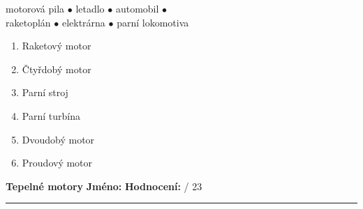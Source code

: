 \documentclass[../main.tex]{subfiles}
\begin{document}
\begin{enumerate}[label={\textbf{\arabic*.}}]
\begin{minipage}{0.45\textwidth}
        \begin{tcolorbox}[colframe=black, colback=white, boxrule=0.6pt]
            {motorová pila \(\bullet\) letadlo \(\bullet\) automobil \(\bullet\) \\ raketoplán \(\bullet\) elektrárna \(\bullet\) parní lokomotiva}
        \end{tcolorbox}
        \begin{enumerate}[label={\arabic*.}]
            \item {Raketový motor}\hfill\tecky{4cm}
            \item {Čtyřdobý motor}\hfill\tecky{4cm}
            \item {Parní stroj}\hfill\tecky{4cm}
            \item {Parní turbína}\hfill\tecky{4cm}
            \item {Dvoudobý motor}\hfill\tecky{4cm}
            \item {Proudový motor}\hfill\tecky{4cm}
        \end{enumerate}
    \end{minipage}
    \hfill
    
    \newpage\pagestyle{empty}
\end{enumerate}
    {\Large\textbf{Tepelné motory}}
    \hfill
    \textbf{Jméno:}
    \tecky{3cm}
    \hspace{0.25cm}
    \textbf{Hodnocení:}
    \tecky{0.5cm}
    {/}
    {23}
    \vspace{0.25cm}
    \hrule
\end{document}
